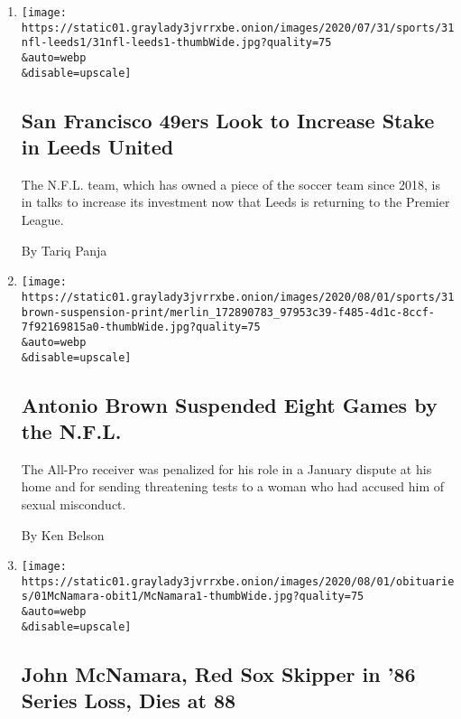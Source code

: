 \begin{enumerate}
\def\labelenumi{\arabic{enumi}.}
\item
  \href{/2020/07/31/sports/soccer/leeds-united-san-francisco-49ers.html}{}

  \texttt{[image: https://static01.graylady3jvrrxbe.onion/images/2020/07/31/sports/31nfl-leeds1/31nfl-leeds1-thumbWide.jpg?quality=75\\\&auto=webp\\\&disable=upscale]}

  \hypertarget{san-francisco-49ers-look-to-increase-stake-in-leeds-united}{%
  \subsection{San Francisco 49ers Look to Increase Stake in Leeds
  United}\label{san-francisco-49ers-look-to-increase-stake-in-leeds-united}}

  The N.F.L. team, which has owned a piece of the soccer team since
  2018, is in talks to increase its investment now that Leeds is
  returning to the Premier League.

  By Tariq Panja
\item
  \href{/2020/07/31/sports/football/antonio-brown-suspension-nfl.html}{}

  \texttt{[image: https://static01.graylady3jvrrxbe.onion/images/2020/08/01/sports/31brown-suspension-print/merlin\_172890783\_97953c39-f485-4d1c-8ccf-7f92169815a0-thumbWide.jpg?quality=75\\\&auto=webp\\\&disable=upscale]}

  \hypertarget{antonio-brown-suspended-eight-games-by-the-nfl}{%
  \subsection{Antonio Brown Suspended Eight Games by the
  N.F.L.}\label{antonio-brown-suspended-eight-games-by-the-nfl}}

  The All-Pro receiver was penalized for his role in a January dispute
  at his home and for sending threatening tests to a woman who had
  accused him of sexual misconduct.

  By Ken Belson
\item
  \href{/2020/07/31/sports/baseball/john-mcnamara-dead.html}{}

  \texttt{[image: https://static01.graylady3jvrrxbe.onion/images/2020/08/01/obituaries/01McNamara-obit1/McNamara1-thumbWide.jpg?quality=75\\\&auto=webp\\\&disable=upscale]}

  \hypertarget{john-mcnamara-red-sox-skipper-in-86-series-loss-dies-at-88}{%
  \subsection{John McNamara, Red Sox Skipper in '86 Series Loss, Dies at
  88}\label{john-mcnamara-red-sox-skipper-in-86-series-loss-dies-at-88}}


\end{enumerate}
